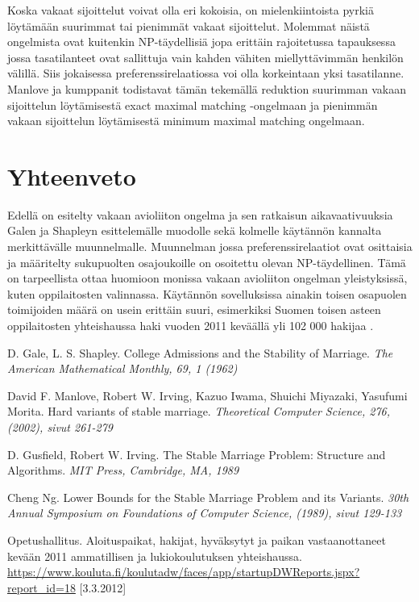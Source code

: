 \documentclass[gradu, twoside]{tktltiki}
\begin{document}
Koska vakaat sijoittelut voivat olla eri kokoisia, on mielenkiintoista
pyrkiä löytämään suurimmat tai pienimmät vakaat sijoittelut. Molemmat
näistä ongelmista ovat kuitenkin NP-täydellisiä jopa erittäin
rajoitetussa tapauksessa jossa tasatilanteet ovat sallittuja vain
kahden vähiten miellyttävimmän henkilön välillä. Siis jokaisessa
preferenssirelaatiossa voi olla korkeintaan yksi tasatilanne. Manlove
ja kumppanit todistavat tämän tekemällä reduktion suurimman vakaan
sijoittelun löytämisestä exact maximal matching -ongelmaan ja
pienimmän vakaan sijoittelun löytämisestä minimum maximal matching
ongelmaan. \cite{manlove02}

\section{Yhteenveto}

Edellä on esitelty vakaan avioliiton ongelma ja sen ratkaisun
aikavaativuuksia Galen ja Shapleyn esittelemälle muodolle sekä
kolmelle käytännön kannalta merkittävälle muunnelmalle. Muunnelman
jossa preferenssirelaatiot ovat osittaisia ja määritelty sukupuolten
osajoukoille on osoitettu olevan NP-täydellinen. Tämä on tarpeellista
ottaa huomioon monissa vakaan avioliiton ongelman yleistyksissä, kuten
oppilaitosten valinnassa. Käytännön sovelluksissa ainakin toisen
osapuolen toimijoiden määrä on usein erittäin suuri, esimerkiksi
Suomen toisen asteen oppilaitosten yhteishaussa haki vuoden 2011
keväällä yli 102 000 hakijaa \cite{OPH12}.

\begin{thebibliography}{XXX99}

  D. Gale, L. S. Shapley.
  College Admissions and the Stability of Marriage.
  \emph{The American Mathematical Monthly, 69, 1 (1962)}

  David F. Manlove, Robert W. Irving, Kazuo Iwama, Shuichi Miyazaki,
  Yasufumi Morita.
  Hard variants of stable marriage.
  \emph{Theoretical Computer Science, 276, (2002), sivut 261-279}

  D. Gusfield, Robert W. Irving.
  The Stable Marriage Problem: Structure and Algorithms.
  \emph{MIT Press, Cambridge, MA, 1989}

  Cheng Ng.
  Lower Bounds for the Stable Marriage Problem and its Variants.
  \emph{30th Annual Symposium on Foundations of Computer Science,
    (1989), sivut 129-133}

  Opetushallitus.
  Aloituspaikat, hakijat, hyväksytyt ja paikan vastaanottaneet
  kevään 2011 ammatillisen ja lukiokoulutuksen yhteishaussa.
  \url{https://www.kouluta.fi/koulutadw/faces/app/startupDWReports.jspx?report_id=18}
      [3.3.2012]

\end{thebibliography}
\end{document}
